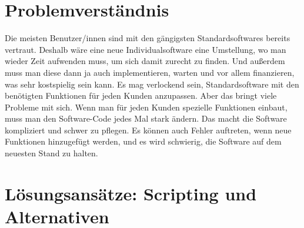 \section{Problemverständnis}

Die meisten Benutzer/innen sind mit den gängigsten Standardsoftwares bereits vertraut. 
Deshalb wäre eine neue Individualsoftware eine Umstellung, wo man wieder Zeit aufwenden muss, 
um sich damit zurecht zu finden. Und außerdem muss man diese dann ja auch implementieren, 
warten und vor allem finanzieren, was sehr kostspielig sein kann. 
Es mag verlockend sein, Standardsoftware mit den benötigten Funktionen für jeden Kunden anzupassen. 
Aber das bringt viele Probleme mit sich. Wenn man für jeden Kunden 
spezielle Funktionen einbaut, muss man den Software-Code jedes Mal stark ändern. 
Das macht die Software kompliziert und schwer zu pflegen. Es können auch Fehler auftreten, 
wenn neue Funktionen hinzugefügt werden, und es wird schwierig, die Software auf dem 
neuesten Stand zu halten.

\newpage
\section{Lösungsansätze: Scripting und Alternativen}






